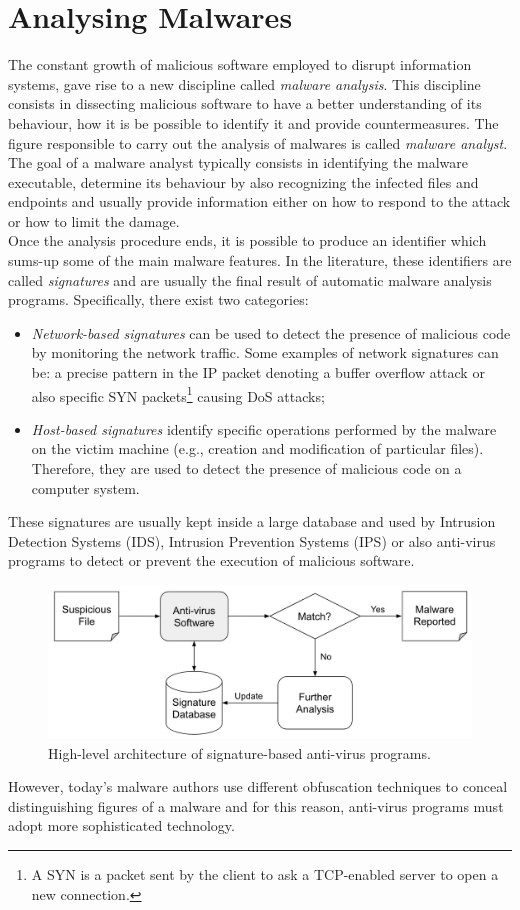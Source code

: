 \documentclass[LaM,binding=0.6cm]{sapthesis}
\begin{document}
\section{Analysing Malwares}
The constant growth of malicious software employed to disrupt information systems, gave rise to a new discipline called \textit{malware analysis}. This discipline consists in dissecting malicious software to have a better understanding of its behaviour, how it is be possible to identify it and provide countermeasures\cite{sikorski2012practical}. The figure responsible to carry out the analysis of malwares is called \textit{malware analyst}. The goal of a malware analyst typically consists in identifying the malware executable, determine its behaviour by also recognizing the infected files and endpoints and usually provide information either on how to respond to the attack or how to limit the damage.\\
Once the analysis procedure ends, it is possible to produce an identifier which sums-up some of the main malware features. In the literature, these identifiers are called \textit{signatures} and are usually the final result of automatic malware analysis programs. Specifically, there exist two categories:
\begin{itemize}
\item \textit{Network-based signatures} can be used to detect the presence of malicious code by monitoring the network traffic. Some examples of network signatures can be: a precise pattern in the IP packet denoting a buffer overflow attack or also specific SYN packets\footnote{A SYN is a packet sent by the client to ask a TCP-enabled server to open a new connection.} causing DoS attacks\cite{fuchsberger2005intrusion};
\item \textit{Host-based signatures} identify specific operations performed by the malware on the victim machine (e.g., creation and modification of particular files). Therefore, they are used to detect the presence of malicious code on a computer system.
\end{itemize}
These signatures are usually kept inside a large database and used by Intrusion Detection Systems (IDS), Intrusion Prevention Systems (IPS) or also anti-virus programs to detect or prevent the execution of malicious software. 
\begin{figure}[h!]
\centering
\includegraphics[scale=.5]{images/background2}
\caption{High-level architecture of signature-based anti-virus programs.}
\end{figure}
\newpage
However, today's malware authors use different obfuscation techniques to conceal distinguishing figures of a malware and for this reason, anti-virus programs must adopt more 
sophisticated technology.\\
\end{document}
